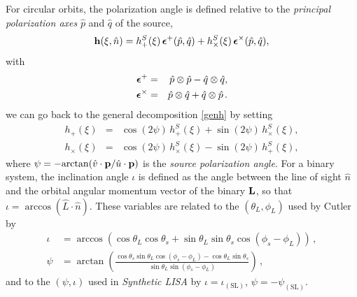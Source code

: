 \documentclass[11pt]{report}
\begin{document}
For circular orbits, the polarization angle is defined relative to the \emph{principal polarization axes} $\hat{p}$ and $\hat{q}$ of the source,
%
\begin{equation}
{\bf h}(\xi,\hat{n}) = h^S_+(\xi) \, {\mbox{\boldmath$\epsilon$}}^{+}(\hat{p},\hat{q}) +
h^S_\times(\xi) \, {\mbox{\boldmath$\epsilon$}}^{\times}(\hat{p},\hat{q}),
\end{equation}
%
with
%
\begin{eqnarray}\label{poltensors}
{\mbox{\boldmath$\epsilon$}}^{+} &=& \hat{p}\otimes\hat{p} - \hat{q}\otimes\hat{q} , \nonumber \\
{\mbox{\boldmath$\epsilon$}}^{\times} &=& \hat{p}\otimes\hat{q} + \hat{q}\otimes\hat{p} \, .
\end{eqnarray}
%
we can go back to the general decomposition \eqref{genh} by setting
%
\begin{eqnarray}
h_+(\xi) &=& \cos (2\psi) \, h^S_+(\xi)  + \sin (2 \psi) \, h^S_\times(\xi), \\
h_\times(\xi) &=& \cos (2\psi) \, h^S_\times(\xi)  - \sin (2 \psi) \, h^S_+(\xi),
\end{eqnarray}
%
where $\psi=-{\rm arctan}(\hat{v}\cdot{\bf p}/\hat{u}\cdot{\bf p})$ is the \emph{source polarization angle}.
For a binary system, the inclination angle $\iota$ is defined as the angle between the line of sight
$\hat{n}$ and the orbital angular momentum vector of the binary ${\bf L}$, so that $\iota = \arccos(\hat{L}\cdot
\hat{n})$.
These variables are related to the $(\theta_L,\phi_L)$ used by Cutler~\cite{cutler98} by
%
\begin{equation}
\label{eq:iotatocutler}
\begin{aligned}
\iota &= \arccos\left(\cos\theta_L \cos\theta_s +\sin\theta_L \sin\theta_s \cos(\phi_s -\phi_L) \right) \,, \\
\psi &= \arctan\left( \frac{\cos\theta_s \sin\theta_L \cos(\phi_s-\phi_L) - \cos\theta_L \sin\theta_s}
{\sin\theta_L \sin(\phi_s-\phi_L)} \right)\, ,
\end{aligned}
\end{equation}
%
and to the $(\psi,\iota)$  used in \emph{Synthetic LISA} \cite{synthlisa,vallis2005} by
$\iota = \iota_\mathrm{(SL)}$, $\psi = -\psi_\mathrm{(SL)}$.
\end{document}
